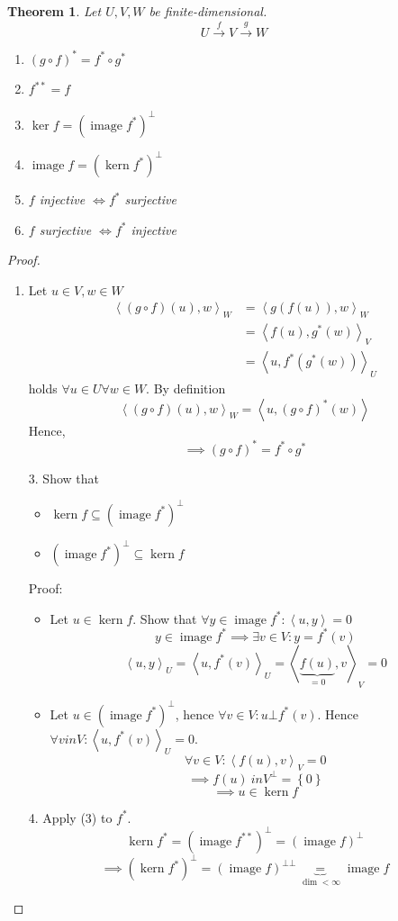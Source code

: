 \documentclass{article}
\newtheorem{theorem}{Theorem}  \numberwithin{theorem}{section}
\newcommand{\set}[1]{\left\{#1\right\}}
\newcommand{\ip}[2]{\left\langle#1,#2\right\rangle} %
\DeclareMathOperator{\im}{image}
\DeclareMathOperator{\ke}{kern}
\begin{document}
\begin{theorem} %
  Let $U, V, W$ be finite-dimensional.
  \[ U \xrightarrow f V \xrightarrow g W \]
  \begin{enumerate}
    \item $(g \circ f)^* = f^* \circ g^*$
    \item $f^{**} = f$
    \item $\ker{f} = (\im{f^*})^\bot$
    \item $\im{f} = (\ke{f^*})^\bot$
    \item $f$ injective $\iff f^*$ surjective
    \item $f$ surjective $\iff f^*$ injective
  \end{enumerate}
\end{theorem}
\begin{proof}
  \begin{enumerate}
    \item Let $u \in V, w \in W$
      \begin{align*}
        \ip{(g \circ f)(u)}{w}_W &= \ip{g(f(u))}{w}_W \\
          &= \ip{f(u)}{g^*(w)}_V \\
          &= \ip{u}{f^*(g^*(w))}_U
      \end{align*}
      holds $\forall u \in U \forall w \in W$. By definition
      \[ \ip{(g \circ f)(u)}{w}_W = \ip{u}{(g \circ f)^*(w)} \]
      Hence,
      \[ \implies (g \circ f)^* = f^* \circ g^* \]
    \item[3.] Show that
      \begin{itemize}
        \item $\ke{f} \subseteq (\im{f^*})^\bot$
        \item $(\im{f^*})^\bot \subseteq \ke{f}$
      \end{itemize}
      Proof:
      \begin{itemize}
        \item Let $u \in \ke{f}$. Show that $\forall y \in \im{f^*}: \ip uy = 0$
          \[ y \in \im{f^*} \implies \exists v \in V: y = f^*(v) \]
          \[ {\ip uy}_U = \ip{u}{f^*(v)}_U = \ip{\underbrace{f(u)}_{=0}}{v}_V = 0 \]
        \item Let $u \in (\im{f^*})^\bot$, hence $\forall v \in V: u \bot f^*(v)$.
          Hence $\forall v in V: \ip{u}{f^*(v)}_U = 0$.
          \[ \forall v \in V: \ip{f(u)}{v}_V = 0 \]
          \[ \implies f(u) \ in V^\bot = \set{0} \]
          \[ \implies u \in \ke{f} \]
      \end{itemize}
    \item[4.]
      Apply (3) to $f^*$.
      \[ \ke{f^*} = (\im{f^{**}})^\bot = (\im{f})^\bot \]
      \[ \implies \left(\ke{f^*}\right)^\bot = (\im{f})^{\bot\bot} \underbrace{=}_{\dim < \infty} \im{f} \]
  \end{enumerate}
\end{proof}
\end{document}
